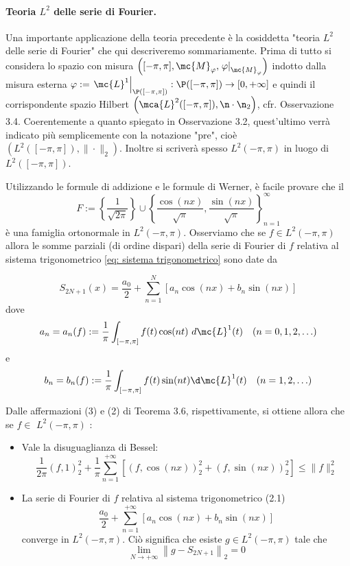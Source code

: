 \paragraph{Teoria $L^2$ delle serie di Fourier.} Una importante applicazione della teoria precedente è la cosiddetta "teoria $L^{2}$ delle serie di Fourier" che qui descriveremo sommariamente. Prima di tutto si considera lo spazio con misura $\left([-\pi, \pi], \mc{M}_{\varphi},\left.\varphi\right|_{\mc{M}_{\varphi}}\right)$ indotto dalla misura esterna $\varphi:=\left.\mc{L}^{1}\right|_{\P([-\pi, \pi])}: \P([-\pi, \pi]) \rightarrow [0,+\infty]$ e quindi il corrispondente spazio Hilbert $\left(\mca{L}^{2}([-\pi, \pi]),\n\cdot\n_{2}\right)$, cfr. Osservazione 3.4. Coerentemente a quanto spiegato in Osservazione 3.2, quest'ultimo verrà indicato più semplicemente con la notazione "pre", cioè $\left(L^{2}([-\pi, \pi]),\|\cdot\|_{2}\right)$. Inoltre si scriverà spesso $L^{2}(-\pi, \pi)$ in luogo di $L^{2}([-\pi, \pi])$.

Utilizzando le formule di addizione e le formule di Werner, è facile provare che il 
\begin{equation}
F:=\left\{\frac{1}{\sqrt{2 \pi}}\right\} \cup\left\{\frac{\cos (n x)}{\sqrt{\pi}}, \frac{\sin (n x)}{\sqrt{\pi}}\right\}_{n=1}^{\infty}\label{eq: sistema trigonometrico}
\end{equation}
è una famiglia ortonormale in $L^{2}(-\pi, \pi)$. Osserviamo che se $f \in L^{2}(-\pi, \pi)$ allora le somme parziali (di ordine dispari) della serie di Fourier di $f$ relativa al sistema trigonometrico \eqref{eq: sistema trigonometrico} sono date da

\[
S_{2 N+1}(x)=\frac{a_{0}}{2}+\sum_{n=1}^{N}\left[a_{n} \cos (n x)+b_{n} \sin (n x)\right]
\]
dove
\[
    a_{n}=a_{n}(f):=\frac{1}{\pi} \int_{[-\pi, \pi]} f(t) \cos (n t)\ d \mc{L}^{1}(t) \quad(n=0,1,2, \ldots)
\]
e
\[
b_{n}=b_{n}(f):=\frac{1}{\pi} \int_{[-\pi, \pi]} f(t) \sin (n t)\d \mc{L}^{1}(t) \quad(n=1,2, \ldots)
\]

Dalle affermazioni (3) e (2) di Teorema 3.6, rispettivamente, si ottiene allora che se $f \in$ $L^{2}(-\pi, \pi)$ :

\begin{itemize}
    \item Vale la disuguaglianza di Bessel:
    \begin{equation}
    \frac{1}{2 \pi}(f, 1)_{2}^{2}+\frac{1}{\pi} \sum_{n=1}^{+\infty}\left[(f, \cos (n x))_{2}^{2}+(f, \sin (n x))_{2}^{2}\right] \leq\|f\|_{2}^{2}
    \end{equation}
    \item La serie di Fourier di $f$ relativa al sistema trigonometrico (2.1)
    \begin{equation}
    \frac{a_{0}}{2}+\sum_{n=1}^{+\infty}\left[a_{n} \cos (n x)+b_{n} \sin (n x)\right]
    \end{equation}
    converge in $L^{2}(-\pi, \pi)$. Ciò significa che esiste $g \in L^{2}(-\pi, \pi)$ tale che
    \[
        \lim_{N \rightarrow+\infty}\left\|g-S_{2 N+1}\right\|_{2}=0
    \]
\end{itemize}

